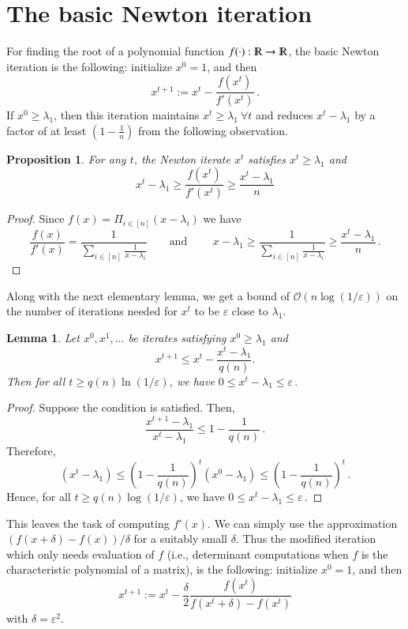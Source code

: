 \documentclass{article}[12pt]
\newtheorem{proposition}[theorem]{Proposition}
\newtheorem{lemma}[theorem]{Lemma}
\theoremstyle{definition}
\renewcommand{\mathbb}{\varmathbb}
\renewcommand{\leq}{\leqslant}
\renewcommand{\geq}{\geqslant}
\newcommand{\mper}{\,.}
\newcommand{\paren}[1]{\left(#1 \right )}
\newcommand{\defeq}{\stackrel{\textup{def}}{=}}
\newcommand{\R}{\mathbb R}
\newcommand{\e}{\epsilon}
\let\e\varepsilon
\newcommand{\bigO}{\mathcal{O}}
\newcommand{\bigo}[1]{\bigO\left(#1\right)}
\renewcommand{\defeq}{:=}
\newcommand{\charp}{f}
\begin{document}
\section{The basic Newton iteration}
\label{sec:Newton}
For finding the root of a polynomial function $\charp(\cdot) : \R \to \R$, the basic Newton iteration is the following:
initialize $x^0 = 1$, 
and then
\[ x^{t+1} \defeq x^t - \frac{\charp(x^t)}{\charp'(x^t)} \mper \]
If $x^0 \geq \lambda_1$, then this iteration maintains $x^t \geq \lambda_1\ \forall t$ and 
reduces $x^t-\lambda_1$ by a factor of at least $\paren{1-\frac{1}{n}}$ from the following observation.
\begin{proposition}
For any $t$, the Newton iterate $x^t$ satisfies $x^t  \geq \lambda_1$ and 
\[ x^t -\lambda_1 \geq \frac{\charp(x^t)}{\charp'(x^t)} \geq \frac{x^t - \lambda_1}{n} \]
\end{proposition}
\begin{proof}
Since $\charp(x) = \Pi_{i \in [n]}(x - \lambda_i)$ we have
\[ \frac{\charp(x)}{\charp'(x)}  = \frac{1}{ \sum_{i \in [n]}  \frac{1}{x - \lambda_i}} \qquad \textrm{and } \qquad
x - \lambda_1 \geq \frac{1}{ \sum_{i \in [n]}  \frac{1}{x - \lambda_i}} \geq \frac{x^t - \lambda_1}{n} \mper   \]
\end{proof}
Along with the next elementary lemma, we get a bound of $\bigo{n \log \paren{1/\e}}$ on the number of iterations
needed for $x^t$ to be $\e$ close to $\lambda_1$. 
\begin{lemma}
\label{lem:noofits1}
Let $x^0, x^1, \ldots$ be iterates satisfying $x^0 \geq \lambda_1$ and  
\[  x^{t + 1} \leq  x^t -  \frac{x^t - \lambda_1 }{q(n) }. \]
Then for all $t\geq q(n) \ln (1/\e)$, we have 
$  0 \leq x^t - \lambda_1 \leq \e \mper   $
\end{lemma}

\begin{proof}
Suppose the condition is satisfied. Then, 
\[   \frac{ x^{t+1} - \lambda_1  }{ x^t - \lambda_1 } \leq 1 - \frac{1}{ q(n)} \mper  \]
Therefore,
\[  \paren{x^t - \lambda_1} \leq   \paren{1 - \frac{1}{ q(n)}}^t \paren{x^0 - \lambda_1} 
\leq \paren{1 - \frac{1}{q(n)}}^t  \mper \]
Hence, for all $t \geq q(n) \log \paren{1/\e}$, we have  
$ 0 \leq  x^t - \lambda_1 \leq \e \mper  $
\end{proof}

This leaves the task of computing $\charp'(x)$. We can simply use the 
approximation $(\charp(x+\delta)-\charp(x))/\delta$ for a suitably small
$\delta$. Thus the modified iteration which only needs evaluation of $\charp$ (i.e., determinant computations
when $\charp$ is the characteristic polynomial of a matrix), 
is the following: initialize $x^0 = 1$, and then 
\[ x^{t+1} \defeq x^t - \frac{\delta}{2}\frac{\charp(x^t)}{\charp(x^t+\delta)-\charp(x^t)}  \]
with $\delta = \e^2$.
 
\end{document}
